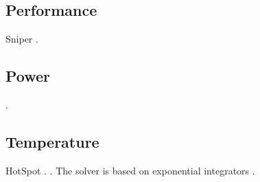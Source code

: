 \subsection{Performance}
Sniper \cite{carlson2011}.


\subsection{Power}
 \cite{li2009}.

\subsection{Temperature}
HotSpot \cite{skadron2004}.
 \cite{sridhar2010}.
The solver is based on exponential integrators \cite{ukhov2012}.
